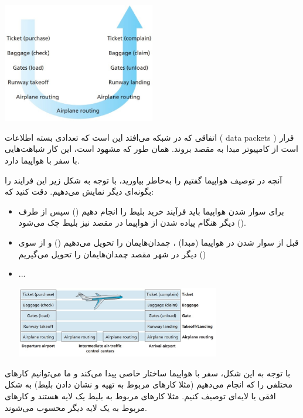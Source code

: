 \documentclass[]{article}
\begin{document}
\begin{center}
\includegraphics[width=0.5\textwidth]{images/1.jpg}
\end{center}

اتفاقی که در شبکه می‌افتد این است که تعدادی بسته اطلاعات ( data packets ) قرار است از کامپیوتر مبدا به مقصد بروند. همان طور که مشهود است، این کار شباهت‌هایی با سفر با هواپیما دارد.

 
آنچه در توصیف هواپیما گفتیم را به‌خاطر بیاورید، با توجه به شکل زیر این فرایند را بگونه‌ای دیگر نمایش می‌دهیم. دقت کنید که:


\begin{itemize}
\item
برای سوار شدن هواپیما باید فرآیند خرید بلیط را انجام دهیم () سپس از طرف دیگر هنگام پیاده شدن از هواپیما در مقصد نیز بلیط چک می‌شود (‌). 
\item
قبل از سوار شدن در هواپیما (مبدا) ، چمدان‌هایمان را تحویل می‌دهیم () و از سوی دیگر در شهر مقصد چمدان‌هایمان را تحویل می‌گیریم ()

\item
...

\begin{center}
\includegraphics[width=0.7\textwidth]{images/2.jpg}
\end{center}
\end{itemize}

با توجه به این شکل، سفر با هواپیما ساختار خاصی پیدا می‌کند و ما می‌توانیم کارهای مختلفی را که انجام می‌دهیم (مثلا کارهای مربوط به تهیه و نشان دادن بلیط‌) به شکل افقی یا لایه‌ای توصیف کنیم. مثلا کارهای مربوط به بلیط یک لایه هستند و کارهای مربوط به  یک لایه دیگر محسوب می‌شوند.
\end{document}
